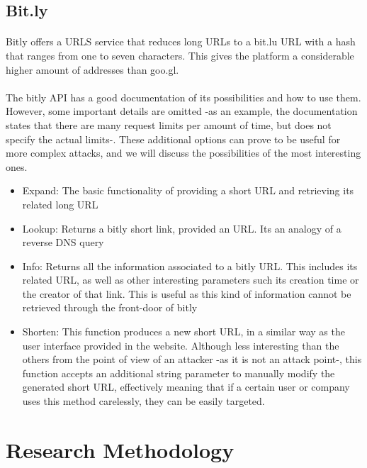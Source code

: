 \documentclass[12pt]{article}
\begin{document}
\subsection{Bit.ly}

\paragraph{}
Bitly offers a URLS service that reduces long URLs to a bit.lu URL with a hash that ranges from one to seven characters. This gives the platform a considerable higher amount of addresses than goo.gl.

\paragraph{}
The bitly API has a good documentation of its possibilities and how to use them. However, some important details are omitted -as an example, the documentation states that there are many request limits per amount of time, but does not specify the actual limits-. These additional options can prove to be useful for more complex attacks, and we will discuss the possibilities of the most interesting ones. \cite{billy}

\begin{itemize}

\item {Expand: The basic functionality of providing a short URL and retrieving its related long URL}
\item{Lookup: Returns a bitly short link, provided an URL. Its an analogy of a reverse DNS query}
\item {Info: Returns all the information associated to a bitly URL. This includes its related URL, as  well as other interesting parameters such its creation time or the creator of that link. This is useful as this kind of information cannot be retrieved through the front-door of bitly}
\item {Shorten: This function produces a new short URL, in a similar way as the user interface provided in the website. Although less interesting than the others from the point of view of an attacker -as it is not an attack point-, this function accepts an additional string parameter to manually modify the generated short URL, effectively meaning that if a certain user or company uses this method carelessly, they can be easily targeted.}
\end{itemize}


\newpage
\section{Research Methodology}
\end{document}
